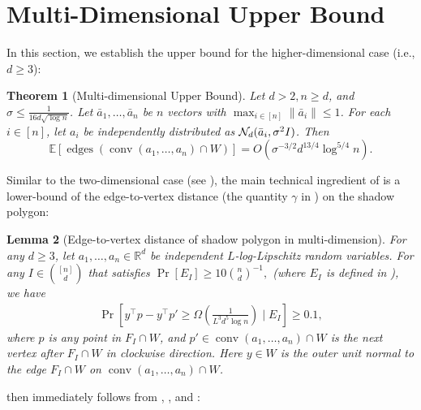\documentclass{article}\usepackage[a4paper,margin=20mm]{geometry}
\newtheorem{theorem}{Theorem}\newtheorem{lemma}[theorem]{Lemma}\newtheorem{proposition}[theorem]{Proposition}\newtheorem{corollary}[theorem]{Corollary}\newtheorem{definition}[theorem]{Definition}\newtheorem{claim}[theorem]{Claim}\newtheorem{remark}[theorem]{Remark}\newtheorem{observation}[theorem]{Observation}\newtheorem{conjecture}[theorem]{Conjecture}\newtheorem{example}[theorem]{Example}
\newcommand{\R}{\mathbb R}
\newcommand{\E}{\mathbb E}
\newcommand{\conv}{\operatorname{conv}}
\newcommand{\edges}{\operatorname{edges}}
\begin{document}
\section{Multi-Dimensional Upper Bound}\label{sec:ub-multi-new}


In this section, we establish the upper bound for the higher-dimensional case (i.e., $d \geq 3$):

\begin{theorem}[Multi-dimensional Upper Bound]\label{thm:ub-multi}
    Let $d > 2, n \geq d$, and $\sigma \leq \frac{1}{16d\sqrt{\log n}}$.
    Let $\bar{a}_1, \ldots, \bar{a}_n$ be $n$ vectors with $\max_{i \in [n]} \|\bar{a}_i\| \leq 1$. For each $i \in [n]$, let $a_i$ be independently distributed as
    $\mathcal{N}_d(\Bar{a}_i, \sigma^2 I)$. Then
    \begin{equation}\label{eq:ub-multi}
        \E[\edges( \conv(a_1,\dots,a_n) \cap W)] = O\left( \sigma^{-3/2} d^{13/4} \log^{5/4} n \right).
    \end{equation}
\end{theorem}


Similar to the two-dimensional case (see ), the main technical ingredient of  is a lower-bound of the edge-to-vertex distance (the quantity $\gamma$ in ) on the shadow polygon:

\begin{lemma}[Edge-to-vertex distance of shadow polygon in multi-dimension]\label{lem:normalvector}
    For any $d \geq 3$,
    let $a_1, \ldots, a_n \in \R^d$ be independent $L$-log-Lipschitz random variables.
    For any $I \in \binom{[n]}{d}$ that satisfies
    \(
    \Pr[E_I] \geq 10\binom{n}{d}^{-1},
    \)
    (where $E_I$ is defined in ),
    we have
    \begin{align*}
        \Pr[y^\top p - y^\top p' \geq  \Omega(\frac{1}{L^3d^5 \log n})\mid E_I ] \geq 0.1,
    \end{align*}
    where $p$ is any point in $F_I \cap W$, and $p' \in \conv(a_1,\dots,a_n)\cap W$ is the next vertex after $F_I \cap W$ in clockwise direction.
    Here $y \in W$ is the outer unit normal to the edge $F_I \cap W$ on $\conv(a_1, \ldots, a_n) \cap W$.
\end{lemma}

 then immediately follows from , ,  and :
\end{document}
